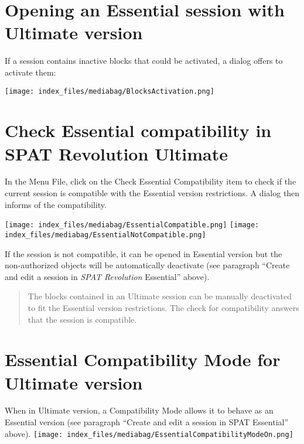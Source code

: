 \documentclass[
  letterpaper,
  DIV=11,
  numbers=noendperiod]{scrreport}
\begin{document}
\hypertarget{opening-an-essential-session-with-ultimate-version}{%
\section{Opening an Essential session with Ultimate
version}\label{opening-an-essential-session-with-ultimate-version}}

If a session contains inactive blocks that could be activated, a dialog
offers to activate them:

\texttt{[image: index\_files/mediabag/BlocksActivation.png]}

\hypertarget{check-essential-compatibility-in-spat-revolution-ultimate}{%
\section{Check Essential compatibility in SPAT Revolution
Ultimate}\label{check-essential-compatibility-in-spat-revolution-ultimate}}

In the Menu File, click on the Check Essential Compatibility item to
check if the current session is compatible with the Essential version
restrictions. A dialog then informs of the compatibility.

\texttt{[image: index\_files/mediabag/EssentialCompatible.png]}
\texttt{[image: index\_files/mediabag/EssentialNotCompatible.png]}

If the session is not compatible, it can be opened in Essential version
but the non-authorized objects will be automatically deactivate (see
paragraph ``Create and edit a session in \emph{SPAT Revolution}
Essential'' above).

\begin{quote}
The blocks contained in an Ultimate session can be manually deactivated
to fit the Essential version restrictions. The check for compatibility
answers that the session is compatible.
\end{quote}

\hypertarget{essential-compatibility-mode-for-ultimate-version}{%
\section{Essential Compatibility Mode for Ultimate
version}\label{essential-compatibility-mode-for-ultimate-version}}

When in Ultimate version, a Compatibility Mode allows it to behave as an
Essential version (see paragraph ``Create and edit a session in SPAT
Essential'' above).
\texttt{[image: index\_files/mediabag/EssentialCompatibilityModeOn.png]}
\end{document}
